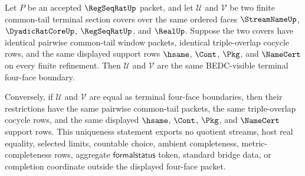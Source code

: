 \begin{theorem}
\label{thm:regseqrat-common-tail-terminal-four-face-cocycle-uniqueness}
Let $P$ be an accepted $\RegSeqRatUp$ packet, and let $\mathcal U$ and $\mathcal V$ be two finite common-tail terminal section covers over the same ordered faces $\StreamNameUp$, $\DyadicRatCoreUp$, $\RegSeqRatUp$, and $\RealUp$. Suppose the two covers have identical pairwise common-tail window packets, identical triple-overlap cocycle rows, and the same displayed support rows $\hsame$, $\Cont$, $\Pkg$, and $\NameCert$ on every finite refinement. Then $\mathcal U$ and $\mathcal V$ are the same BEDC-visible terminal four-face boundary.

Conversely, if $\mathcal U$ and $\mathcal V$ are equal as terminal four-face boundaries, then their restrictions have the same pairwise common-tail packets, the same triple-overlap cocycle rows, and the same displayed $\hsame$, $\Cont$, $\Pkg$, and $\NameCert$ support rows. This uniqueness statement exports no quotient streams, host real equality, selected limits, countable choice, ambient completeness, metric-completeness rows, aggregate $\mathsf{formalstatus}$ token, standard bridge data, or completion coordinate outside the displayed four-face packet.
\end{theorem}
